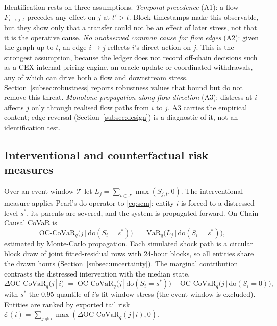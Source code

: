 \documentclass[referee,pdflatex,sn-mathphys-ay]{sn-jnl}
\theoremstyle{thmstyleone}%
\theoremstyle{thmstyletwo}%
\theoremstyle{thmstylethree}%
\newcommand{\doop}{\mathrm{do}}
\newcommand{\VaR}{\mathrm{VaR}}
\newcommand{\OCCoVaR}{\text{OC-CoVaR}}
\begin{document}
Identification rests on three assumptions. \emph{Temporal precedence} (A1): a flow
$F_{i\to j,t}$ precedes any effect on $j$ at $t'>t$. Block timestamps make this
observable, but they show only that a transfer could not be an effect of later stress, not
that it is the operative cause. \emph{No unobserved common cause for flow edges} (A2): given
the graph up to $t$, an edge $i\to j$ reflects $i$'s direct action on $j$. This is the
strongest assumption, because the ledger does not record off-chain decisions such as a
CEX-internal pricing engine, an oracle update or coordinated withdrawals, any of which can
drive both a flow and downstream stress. Section~\ref{subsec:robustness} reports robustness values that
bound but do not remove this threat. \emph{Monotone propagation along flow direction} (A3): distress
at $i$ affects $j$ only through realised flow paths from $i$ to $j$. A3 carries the
empirical content; edge reversal (Section~\ref{subsec:design}) is a diagnostic of it, not an identification test.

\subsection{Interventional and counterfactual risk measures}
\label{subsec:risk}
Over an event window $\mathcal{T}$ let $L_j=\sum_{t\in\mathcal{T}}\max(S_{j,t},0)$. The
interventional measure applies Pearl's do-operator to \eqref{eq:scm}: entity $i$ is forced
to a distressed level $s^\ast$, its parents are severed, and the system is propagated
forward. On-Chain Causal CoVaR is
\begin{equation}
\label{eq:occovar}
\OCCoVaR_q\big(j \,\big|\, \doop(S_i=s^\ast)\big)
   \;=\; \VaR_q\!\Big(L_j \,\Big|\, \doop(S_i=s^\ast)\Big),
\end{equation}
estimated by Monte-Carlo propagation. Each simulated shock path is a circular block draw of joint fitted-residual rows
with 24-hour blocks, so all entities share the drawn hours (Section~\ref{subsec:uncertainty}). The marginal
contribution contrasts the distressed intervention with the median state,
\begin{equation}
\label{eq:deltaoccovar}
\Delta\OCCoVaR_q(j\,|\,i) \;=\;
\OCCoVaR_q\big(j\,|\,\doop(S_i=s^\ast)\big) -
\OCCoVaR_q\big(j\,|\,\doop(S_i=0)\big),
\end{equation}
with $s^\ast$ the 0.95 quantile of $i$'s fit-window stress (the event window is excluded).
Entities are ranked by exported tail
risk $\mathcal{E}(i)=\sum_{j\ne i}\max(\Delta\OCCoVaR_q(j\,|\,i),0)$.
\end{document}
